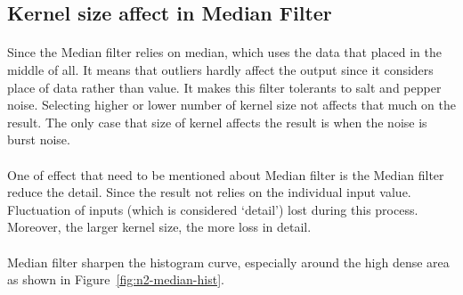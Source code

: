 \documentclass[12pt,a4paper]{report}
\begin{document}
\subsection{Kernel size affect in Median Filter}
\paragraph*{}
Since the Median filter relies on median, which uses the data that placed in the middle of all. It means that outliers hardly affect the output since it considers place of data rather than value. It makes this filter tolerants to salt and pepper noise. Selecting higher or lower number of kernel size not affects that much on the result. The only case that size of kernel affects the result is when the noise is burst noise.
\paragraph*{}One of effect that need to be mentioned about Median filter is the Median filter reduce the detail. Since the result not relies on the individual input value. Fluctuation of inputs (which is considered `detail') lost during this process. Moreover, the larger kernel size, the more loss in detail.
\paragraph*{}Median filter sharpen the histogram curve, especially around the high dense area as shown in Figure~\ref{fig:n2-median-hist}.
\end{document}
